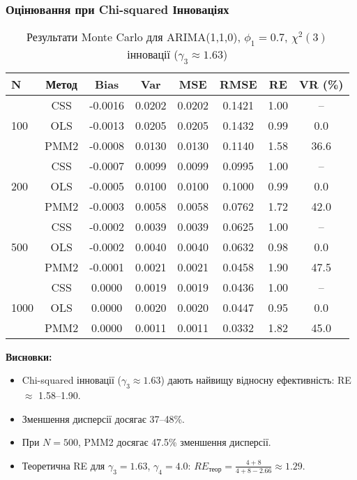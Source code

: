 \documentclass[12pt,a4paper]{article}
\begin{document}
\subsubsection{Оцінювання при Chi-squared Інноваціях}

\begin{table}[h]
\centering
\caption{Результати Monte Carlo для ARIMA(1,1,0), $\phi_1 = 0.7$, $\chi^2(3)$ інновації ($\gamma_3 \approx 1.63$)}
\label{tab:arima110_chisq}
\begin{tabular}{@{}lccccccc@{}}
\toprule
\textbf{N} & \textbf{Метод} & \textbf{Bias} & \textbf{Var} & \textbf{MSE} & \textbf{RMSE} & \textbf{RE} & \textbf{VR (\%)} \\
\midrule
\multirow{3}{*}{100} & CSS  & -0.0016 & 0.0202 & 0.0202 & 0.1421 & 1.00 & -- \\
                     & OLS  & -0.0013 & 0.0205 & 0.0205 & 0.1432 & 0.99 & 0.0 \\
                     & PMM2 & -0.0008 & 0.0130 & 0.0130 & 0.1140 & 1.58 & 36.6 \\
\midrule
\multirow{3}{*}{200} & CSS  & -0.0007 & 0.0099 & 0.0099 & 0.0995 & 1.00 & -- \\
                     & OLS  & -0.0005 & 0.0100 & 0.0100 & 0.1000 & 0.99 & 0.0 \\
                     & PMM2 & -0.0003 & 0.0058 & 0.0058 & 0.0762 & 1.72 & 42.0 \\
\midrule
\multirow{3}{*}{500} & CSS  & -0.0002 & 0.0039 & 0.0039 & 0.0625 & 1.00 & -- \\
                     & OLS  & -0.0002 & 0.0040 & 0.0040 & 0.0632 & 0.98 & 0.0 \\
                     & PMM2 & -0.0001 & 0.0021 & 0.0021 & 0.0458 & 1.90 & 47.5 \\
\midrule
\multirow{3}{*}{1000} & CSS  & 0.0000 & 0.0019 & 0.0019 & 0.0436 & 1.00 & -- \\
                      & OLS  & 0.0000 & 0.0020 & 0.0020 & 0.0447 & 0.95 & 0.0 \\
                      & PMM2 & 0.0000 & 0.0011 & 0.0011 & 0.0332 & 1.82 & 45.0 \\
\bottomrule
\end{tabular}
\end{table}

\textbf{Висновки:}
\begin{itemize}
    \item Chi-squared інновації ($\gamma_3 \approx 1.63$) дають найвищу відносну ефективність: RE $\approx$ 1.58--1.90.
    \item Зменшення дисперсії досягає 37--48\%.
    \item При $N = 500$, PMM2 досягає 47.5\% зменшення дисперсії.
    \item Теоретична RE для $\gamma_3 = 1.63$, $\gamma_4 = 4.0$: $RE_{\text{теор}} = \frac{4+8}{4+8-2.66} \approx 1.29$.
\end{itemize}
\end{document}
